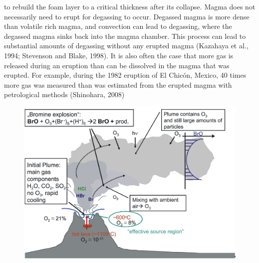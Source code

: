 \documentclass  [
  paper    = a4,
  BCOR     = 10mm,
  twoside,
  fontsize = 12pt,
  fleqn,
  toc      = bibnumbered,
  toc      = listofnumbered,
  numbers  = noendperiod,
  headings = normal,
  listof   = leveldown,
  version  = 3.03
]                                       {scrreprt}
\begin{document}
to rebuild the foam layer to a critical thickness after its collapse.
Magma does not necessarily need to erupt for degassing to occur. Degassed magma is more dense than volatile rich magma, and convection can lead to
degassing, where the degassed magma sinks back into the magma chamber. This
process can lead to substantial amounts of degassing without any erupted magma
(Kazahaya et al., 1994; Stevenson and Blake, 1998). It is also often the case that
more gas is released during an eruption than can be dissolved in the magma
that was erupted. For example, during the 1982 eruption of El Chicón, Mexico,
40 times more gas was measured than was estimated from the erupted magma
with petrological methods (Shinohara, 2008)
		\begin{figure}
		\centering
		\includegraphics[width=0.7\linewidth]{Bilder/Simon/Bilder_Tung/BrO_Plume}
		\caption{}
		\label{fig:broplume}
	\end{figure}
\end{document}
